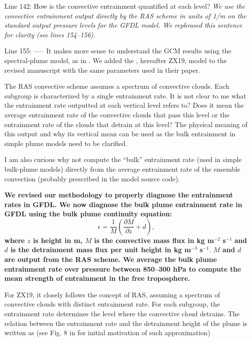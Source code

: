 \documentclass[11pt]{article}
\begin{document}
Line 142: How is the convective entrainment quantified at each level? \emph{We use the convective entrainment output directly by the RAS scheme in units of 1/m on the standard output pressure levels for the GFDL model. We rephrased this sentence for clarity (see lines 154--156).}

Line 155: ----- It makes more sense to understand the GCM results using the spectral-plume model, as in \cite{zhou2019}. We added the \cite{zhou2019}, hereafter ZX19, model to the revised manuscript with the same parameters used in their paper.

The RAS convective scheme assumes a spectrum of convective clouds. Each subgroup is characterized by a single entrainment rate. It is not clear to me what the entrainment rate outputted at each vertical level refers to? Does it mean the average entrainment rate of the convective clouds that pass this level or the entrainment rate of the clouds that detrain at this level? The physical meaning of this output and why its vertical mean can be used as the bulk entrainment in simple plume models need to be clarified.

I am also curious why not compute the ``bulk'' entrainment rate (used in simple bulk-plume models) directly from the average entrainment rate of the ensemble convection (probably prescribed in the model source code).

\textbf{We revised our methodology to properly diagnose the entrainment rates in GFDL. We now diagnose the bulk plume entrainment rate in GFDL using the bulk plume continuity equation:}
\begin{equation}
\epsilon = \frac{1}{M}\left(\frac{\partial M}{\partial z}+d\right),
\end{equation}
\textbf{where \(z\) is height in m, \(M\) is the convective mass flux in kg m}\(^{-2}\) \textbf{s}\(^{-1}\) \textbf{and \(d\) is the detrainment mass flux per unit height in kg m}\(^{-3}\) \textbf{s}\(^{-1}\). \textbf{\(M\) and \(d\) are output from the RAS scheme. We average the bulk plume entrainment rate over pressure between 850--300 hPa to compute the mean strength of entrainment in the free troposphere.}

For ZX19, it closely follows the concept of RAS, assuming a spectrum of convective clouds with distinct entrainment rate. For each subgroup, the entrainment rate determines the level where the convective cloud detrains. The relation between the entrainment rate and the detrainment height of the plume is written as (see Fig. 8 in \cite{arakawa1974} for initial motivation of such approximation)
\end{document}
